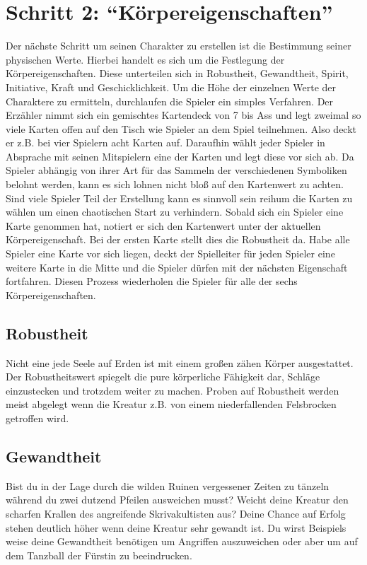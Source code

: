 
    \section{Schritt 2: “Körpereigenschaften”}
        Der nächste Schritt um seinen Charakter zu erstellen ist die Bestimmung seiner physischen Werte. Hierbei handelt es sich um die Festlegung der Körpereigenschaften. Diese unterteilen sich in Robustheit, Gewandtheit, Spirit, Initiative, Kraft und Geschicklichkeit. Um die Höhe der einzelnen Werte der Charaktere zu ermitteln, durchlaufen die Spieler ein simples Verfahren. Der Erzähler nimmt sich ein gemischtes Kartendeck von 7 bis Ass und legt zweimal so viele Karten offen auf den Tisch wie Spieler an dem Spiel teilnehmen. Also deckt er z.B. bei vier Spielern acht Karten auf. Daraufhin wählt jeder Spieler in Absprache mit seinen Mitspielern eine der Karten und legt diese vor sich ab. Da Spieler abhängig von ihrer Art für das Sammeln der verschiedenen Symboliken belohnt werden, kann es sich lohnen nicht bloß auf den Kartenwert zu achten.  Sind viele Spieler Teil der Erstellung kann es sinnvoll sein reihum die Karten zu wählen um einen chaotischen Start zu verhindern. Sobald sich ein Spieler eine Karte genommen hat, notiert er sich den Kartenwert unter der aktuellen Körpereigenschaft. Bei der ersten Karte stellt dies die Robustheit da. Habe alle Spieler eine Karte vor sich liegen, deckt der Spielleiter für jeden Spieler eine weitere Karte in die Mitte und die Spieler dürfen mit der nächsten Eigenschaft fortfahren. Diesen Prozess wiederholen die Spieler für alle der sechs Körpereigenschaften. 
        
        \subsection*{Robustheit}
            Nicht eine jede Seele auf Erden ist mit einem großen zähen Körper ausgestattet. Der Robustheitswert spiegelt die pure körperliche Fähigkeit dar, Schläge einzustecken und trotzdem weiter zu machen. Proben auf Robustheit werden meist abgelegt wenn die Kreatur z.B. von einem niederfallenden Felsbrocken getroffen wird.

        
        \subsection*{Gewandtheit}
            Bist du in der Lage durch die wilden Ruinen vergessener Zeiten zu tänzeln während du zwei dutzend Pfeilen ausweichen musst? Weicht deine Kreatur den scharfen Krallen des angreifende Skrivakultisten aus? Deine Chance auf Erfolg stehen deutlich höher wenn deine Kreatur sehr gewandt ist. Du wirst Beispiels weise deine Gewandtheit benötigen um Angriffen auszuweichen oder aber um auf dem Tanzball der Fürstin zu beeindrucken.

